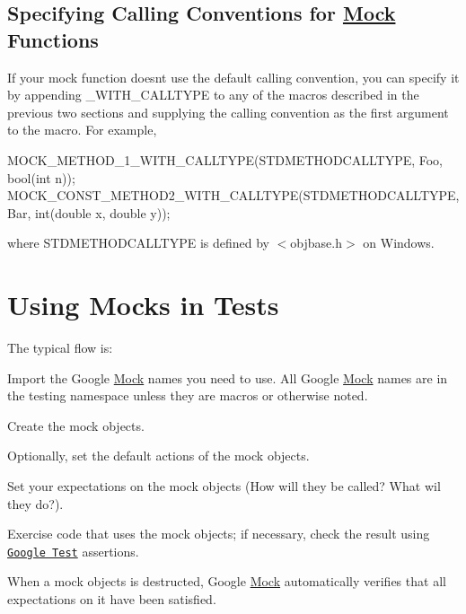 \subsection*{Specifying Calling Conventions for \hyperlink{class_mock}{Mock} Functions}

If your mock function doesn\textquotesingle{}t use the default calling convention, you can specify it by appending {\ttfamily \+\_\+\+W\+I\+T\+H\+\_\+\+C\+A\+L\+L\+T\+Y\+PE} to any of the macros described in the previous two sections and supplying the calling convention as the first argument to the macro. For example, 
\begin{DoxyCode}
MOCK\_METHOD\_1\_WITH\_CALLTYPE(STDMETHODCALLTYPE, Foo, bool(int n));
MOCK\_CONST\_METHOD2\_WITH\_CALLTYPE(STDMETHODCALLTYPE, Bar, int(double x, double y));
\end{DoxyCode}
 where {\ttfamily S\+T\+D\+M\+E\+T\+H\+O\+D\+C\+A\+L\+L\+T\+Y\+PE} is defined by {\ttfamily $<$objbase.\+h$>$} on Windows.

\section*{Using Mocks in Tests}

The typical flow is\+:
\begin{DoxyEnumerate}
\item Import the Google \hyperlink{class_mock}{Mock} names you need to use. All Google \hyperlink{class_mock}{Mock} names are in the {\ttfamily testing} namespace unless they are macros or otherwise noted.
\end{DoxyEnumerate}
\begin{DoxyEnumerate}
\item Create the mock objects.
\end{DoxyEnumerate}
\begin{DoxyEnumerate}
\item Optionally, set the default actions of the mock objects.
\end{DoxyEnumerate}
\begin{DoxyEnumerate}
\item Set your expectations on the mock objects (How will they be called? What wil they do?).
\end{DoxyEnumerate}
\begin{DoxyEnumerate}
\item Exercise code that uses the mock objects; if necessary, check the result using \href{../../googletest/}{\tt Google Test} assertions.
\end{DoxyEnumerate}
\begin{DoxyEnumerate}
\item When a mock objects is destructed, Google \hyperlink{class_mock}{Mock} automatically verifies that all expectations on it have been satisfied.
\end{DoxyEnumerate}

